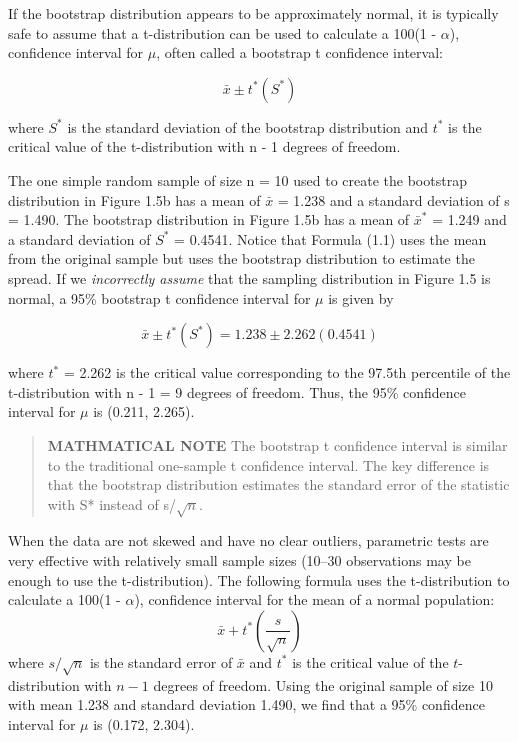 \documentclass[
]{report}
\begin{document}
If the bootstrap distribution appears to be approximately normal, it is typically safe to assume that a t-distribution can be used to calculate a 100(1 - \(\alpha\)), confidence interval for \(\mu\), often called a bootstrap t confidence interval:

\begin{equation} 
  \bar{x} \pm t^*\left(S^*\right)
  \tag{1.1} \label{eq:1_1}
\end{equation}

where \(S^*\) is the standard deviation of the bootstrap distribution and \(t^*\) is the critical value of the t-distribution with n - 1 degrees of freedom.

The one simple random sample of size n = 10 used to create the bootstrap distribution in Figure 1.5b has a mean of \(\bar{x}\) = 1.238 and a standard deviation of s = 1.490. The bootstrap distribution in Figure 1.5b has a mean of \(\bar{x}^*\) = 1.249 and a standard deviation of \(S^*\) = 0.4541. Notice that Formula (1.1) uses the mean from the original sample but uses the bootstrap distribution to estimate the spread. If we \emph{incorrectly assume} that the sampling distribution in Figure 1.5 is normal, a 95\% bootstrap t confidence interval for \(\mu\) is given by

\begin{equation} 
  \bar{x} \pm t^*\left(S^*\right) = 1.238 \pm 2.262(0.4541)
\end{equation}

where \(t^*\) = 2.262 is the critical value corresponding to the 97.5th percentile of the t-distribution with n - 1 = 9 degrees of freedom. Thus, the 95\% confidence interval for \(\mu\) is (0.211, 2.265).

\begin{quote}
\textbf{MATHMATICAL NOTE} The bootstrap t confidence interval is similar to the traditional one-sample t confidence interval. The key difference
is that the bootstrap distribution estimates the standard error of the statistic with S* instead of s/\(\sqrt{n}\).
\end{quote}

When the data are not skewed and have no clear outliers, parametric tests are very effective with relatively small sample sizes (10--30 observations may be enough to use the t-distribution). The following formula uses the t-distribution to calculate a 100(1 - \(\alpha\)), confidence interval for the mean of a normal population:
\begin{equation} 
  \bar{x} + t^*\left(\frac{s}{\sqrt{n}}\right)
  \tag{1.2} \label{eq:1_2}
\end{equation}
where \(s/\sqrt{n}\) is the standard error of \(\bar{x}\) and \(t^*\) is the critical value of the \(t\)-distribution with \(n - 1\) degrees of freedom. Using the original sample of size 10 with mean 1.238 and standard deviation 1.490, we find that a 95\% confidence interval for \(\mu\) is (0.172, 2.304).
\end{document}
